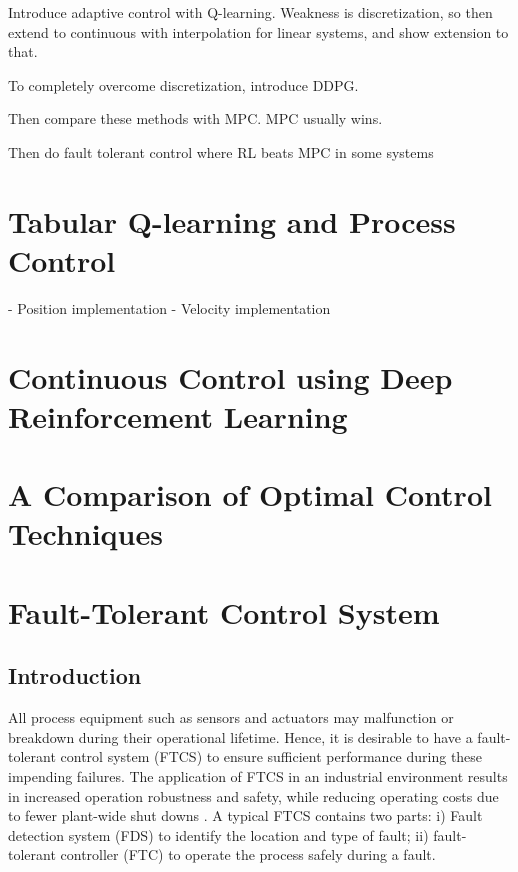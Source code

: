 %
% 

Introduce adaptive control with Q-learning.  Weakness is discretization, so then extend to continuous with interpolation for linear systems, and show extension to that.

To completely overcome discretization, introduce DDPG.

Then compare these methods with MPC. MPC usually wins.

Then do fault tolerant control where RL beats MPC in some systems

\section{Tabular Q-learning and Process Control}
- Position implementation
- Velocity implementation

\section{Continuous Control using Deep Reinforcement Learning}

\section{A Comparison of Optimal Control Techniques}

%
%
% 
%  
% 
% 
% 

\section{Fault-Tolerant Control System}
\subsection{Introduction}
All process equipment such as sensors and actuators may malfunction or breakdown during their operational lifetime. Hence, it is desirable to have a fault-tolerant control system (FTCS) to ensure sufficient performance during these impending failures. The application of FTCS in an industrial environment results in increased operation robustness and safety, while reducing operating costs due to fewer plant-wide shut downs \cite{ftc_book_ref1}. A typical FTCS contains two parts: i) Fault detection system (FDS) to identify the location and type of fault; ii) fault-tolerant controller (FTC) to operate the process safely during a fault.

